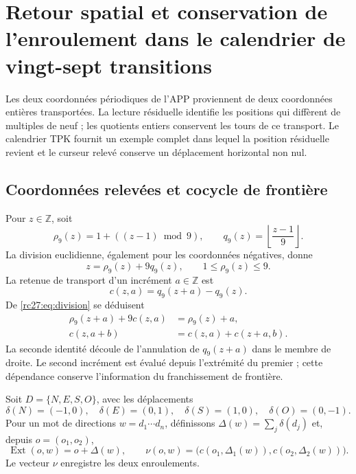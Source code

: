 
\section[Retour spatial et enroulement du curseur]{Retour spatial et conservation de l'enroulement dans le calendrier de vingt-sept transitions}
\label{rc27:sec:cursor}

Les deux coordonnées périodiques de l'APP proviennent de deux coordonnées
entières transportées. La lecture résiduelle identifie les positions qui
diffèrent de multiples de neuf ; les quotients entiers conservent les
tours de ce transport. Le calendrier TPK fournit un exemple
complet dans lequel la position résiduelle revient et le curseur relevé
conserve un déplacement horizontal non nul.

\subsection{Coordonnées relevées et cocycle de frontière}

Pour $z\in\mathbb Z$, soit
\[
\rho_9(z)=1+((z-1)\bmod9),\qquad
q_9(z)=\left\lfloor\frac{z-1}{9}\right\rfloor.
\]
La division euclidienne, également pour les coordonnées négatives, donne
\begin{equation}
z=\rho_9(z)+9q_9(z),\qquad1\le\rho_9(z)\le9.
\label{rc27:eq:division}
\end{equation}
La retenue de transport d'un incrément $a\in\mathbb Z$ est
\[
c(z,a)=q_9(z+a)-q_9(z).
\]
De \eqref{rc27:eq:division} se déduisent
\begin{align}
\rho_9(z+a)+9c(z,a)&=\rho_9(z)+a,\\
c(z,a+b)&=c(z,a)+c(z+a,b).
\label{rc27:eq:cociclo}
\end{align}
La seconde identité découle de l'annulation de $q_9(z+a)$ dans le membre
de droite. Le second incrément est évalué depuis l'extrémité du premier ;
cette dépendance conserve l'information du franchissement de frontière.

Soit $D=\{N,E,S,O\}$, avec les déplacements
\[
\delta(N)=(-1,0),\quad\delta(E)=(0,1),\quad
\delta(S)=(1,0),\quad\delta(O)=(0,-1).
\]
Pour un mot de directions $w=d_1\cdots d_n$, définissons
$\Delta(w)=\sum_j\delta(d_j)$ et, depuis $o=(o_1,o_2)$,
\[
\operatorname{Ext}(o,w)=o+\Delta(w),\qquad
\nu(o,w)=\bigl(c(o_1,\Delta_1(w)),c(o_2,\Delta_2(w))\bigr).
\]
Le vecteur $\nu$ enregistre les deux enroulements.

